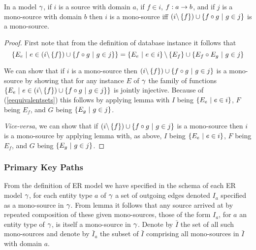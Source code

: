 \begin{lemma}

In a model $\gamma$, if $i$ is a source with domain $a$,
if $f \in i$, $f: a \rightarrow b$, and if $j$ is a mono-source with domain $b$ then 
$i$ is a mono-source iff $(i \backslash \left\{f\right\}) \cup \left\{f \circ g \ \middle|\ g \in j\right\}$ is a mono-source.
\end{lemma}
\begin{proof}
First note that from the definition of database instance it follows that 
\begin{equation}
\label{eequivalentsets}
\left\{E_e \ \middle|\ e \in (i \backslash \left\{f\right\}) \cup \left\{f \circ g \ \middle|\ g \in j\right\}\right\}
= \left\{E_e \ \middle|\ e \in i\right\} \backslash \left\{E_f\right\} \cup \left\{E_f \circ E_g \ \middle|\ g \in j\right\}
\end{equation}

We can show that if $i$ is a mono-source 
then $(i \backslash \left\{f\right\}) \cup \left\{f \circ g \ \middle|\ g \in j\right\}$ is a mono-source
by showing that for any instance $E$ of $\gamma$ the family of functions 
$\left\{E_e \ \middle|\ e \in (i \backslash \left\{f\right\}) \cup \left\{f \circ g \ \middle|\ g \in j\right\}\right\}$
is jointly injective. Because of (\ref{eequivalentsets}) this follows by applying lemma  with $I$ being $\left\{E_e \ \middle|\ e \in i\right\}$,
$F$ being $E_f$,  and $G$ being $\left\{E_g \ \middle|\ g \in j\right\}$.

\textit{Vice-versa}, we can show that if $(i \backslash \left\{f\right\}) \cup \left\{f \circ g \ \middle|\ g \in j\right\}$ is a mono-source then $i$ is a mono-source by applying lemma  
with, as above, $I$ being $\left\{E_e \ \middle|\ e \in i\right\}$,
$F$ being $E_f$,  and $G$ being $\left\{E_g \ \middle|\ g \in j\right\}$.
\end{proof}



\subsubsection{Primary Key Paths }

From the definition of ER model we have specified in the schema of each ER model $\gamma$, for each entity type $a$ of $\gamma$ a set of outgoing edges denoted $I_a$ specified as a mono-source in $\gamma$. From lemma  it follows that any source arrived at by repeated composition of these given mono-sources, those of the form $I_a$, for $a$ an entity type of $\gamma$, is itself a mono-source in $\gamma$. 
Denote by $\bar{I}$ the set  of all such mono-sources and denote by $\bar{I}_a$ the subset of $\bar{I}$ comprising all mono-sources in $\bar{I}$ with domain $a$.

